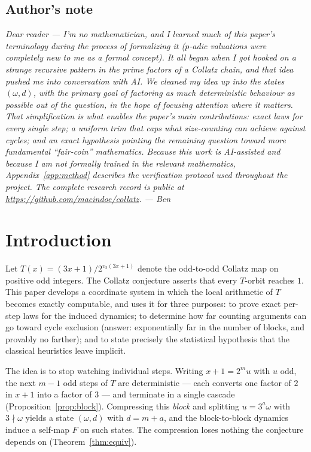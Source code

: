 \documentclass[11pt]{article}
\theoremstyle{remark}
\newcommand{\vt}[1]{v_2\!\left(#1\right)}
\newcommand{\w}{\omega}
\begin{document}
\subsection*{Author's note}

\emph{Dear reader --- I'm no mathematician, and I learned much of this paper's terminology during the process of formalizing it ($p$-adic valuations were completely new to me as a formal concept). It all began when I got hooked on a strange recursive pattern in the prime factors of a Collatz chain, and that idea pushed me into conversation with AI. We cleaned my idea up into the states $(\w,d)$, with the primary goal of factoring as much deterministic behaviour as possible out of the question, in the hope of focusing attention where it matters. That simplification is what enables the paper's main contributions: exact laws for every single step; a uniform trim that caps what size-counting can achieve against cycles; and an exact hypothesis pointing the remaining question toward more fundamental ``fair-coin'' mathematics. Because this work is AI-assisted and because I am not formally trained in the relevant mathematics, Appendix~\ref{app:method} describes the verification protocol used throughout the project. The complete research record is public at \url{https://github.com/macindoe/collatz}. --- Ben}

\section{Introduction}

Let $T(x) = (3x+1)/2^{\vt{3x+1}}$ denote the odd-to-odd Collatz map on positive odd integers. The Collatz conjecture asserts that every $T$-orbit reaches $1$. This paper develops a coordinate system in which the local arithmetic of $T$ becomes exactly computable, and uses it for three purposes: to prove exact per-step laws for the induced dynamics; to determine how far counting arguments can go toward cycle exclusion (answer: exponentially far in the number of blocks, and provably no farther); and to state precisely the statistical hypothesis that the classical heuristics leave implicit.

The idea is to stop watching individual steps. Writing $x + 1 = 2^m u$ with $u$ odd, the next $m-1$ odd steps of $T$ are deterministic --- each converts one factor of $2$ in $x+1$ into a factor of $3$ --- and terminate in a single cascade (Proposition~\ref{prop:block}). Compressing this \emph{block} and splitting $u = 3^a\w$ with $3\nmid\w$ yields a state $(\w, d)$ with $d = m + a$, and the block-to-block dynamics induce a self-map $F$ on such states. The compression loses nothing the conjecture depends on (Theorem~\ref{thm:equiv}).
\end{document}
